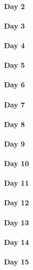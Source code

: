 \documentclass[UTF8,a4paper,8pt]{ctexart}
\begin{document}
 	 \paragraph{Day 2       \quad     }
 	 \paragraph{Day 3       \quad     }
 	 \paragraph{Day 4       \quad     }
 	 \paragraph{Day 5       \quad     }
 	 \paragraph{Day 6       \quad     }
 	 \paragraph{Day 7       \quad     }
 	 \paragraph{Day 8       \quad     }
 	 \paragraph{Day 9       \quad     }
 	 \paragraph{Day 10      \quad     }
 	 \paragraph{Day 11      \quad     }
 	 \paragraph{Day 12      \quad     }
 	 \paragraph{Day 13      \quad     }
 	 \paragraph{Day 14      \quad     }
 	 \paragraph{Day 15      \quad     }
\end{document}
